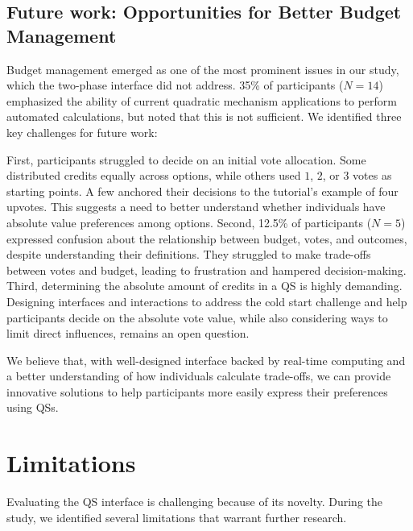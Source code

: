 \subsection{Future work: Opportunities for Better Budget Management}
Budget management emerged as one of the most prominent issues in our study, which the two-phase interface did not address. 35\% of participants ($N=14$) emphasized the ability of current quadratic mechanism applications to perform automated calculations, but noted that this is not sufficient.  We identified three key challenges for future work:

First, participants struggled to decide on an initial vote allocation. Some distributed credits equally across options, while others used $1$, $2$, or $3$ votes as starting points. A few anchored their decisions to the tutorial's example of four upvotes. This suggests a need to better understand whether individuals have absolute value preferences among options. Second, 12.5\% of participants ($N=5$) expressed confusion about the relationship between budget, votes, and outcomes, despite understanding their definitions. They struggled to make trade-offs between votes and budget, leading to frustration and hampered decision-making. Third, determining the absolute amount of credits in a QS is highly demanding. Designing interfaces and interactions to address the cold start challenge and help participants decide on the absolute vote value, while also considering ways to limit direct influences, remains an open question.

We believe that, with well-designed interface backed by real-time computing and a better understanding of how individuals calculate trade-offs, we can provide innovative solutions to help participants more easily express their preferences using QSs.

\section{Limitations}
\label{sec:limitations}
Evaluating the QS interface is challenging because of its novelty. During the study, we identified several limitations that warrant further research.

